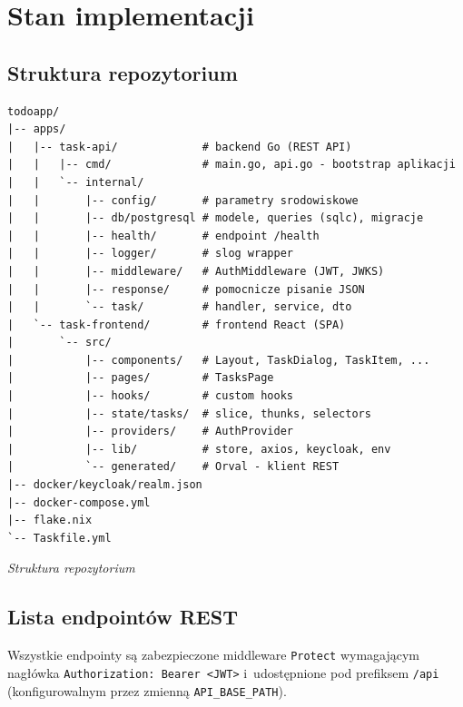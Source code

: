 \documentclass[12pt, a4paper, oneside]{article}
\newcommand{\codecaption}[1]{\par\vspace{-0.4em}\noindent\small\textit{#1}\par\vspace{0.3em}}
\begin{document}
\section{Stan implementacji}

\subsection{Struktura repozytorium}
\begin{verbatim}
todoapp/
|-- apps/
|   |-- task-api/             # backend Go (REST API)
|   |   |-- cmd/              # main.go, api.go - bootstrap aplikacji
|   |   `-- internal/
|   |       |-- config/       # parametry srodowiskowe
|   |       |-- db/postgresql # modele, queries (sqlc), migracje
|   |       |-- health/       # endpoint /health
|   |       |-- logger/       # slog wrapper
|   |       |-- middleware/   # AuthMiddleware (JWT, JWKS)
|   |       |-- response/     # pomocnicze pisanie JSON
|   |       `-- task/         # handler, service, dto
|   `-- task-frontend/        # frontend React (SPA)
|       `-- src/
|           |-- components/   # Layout, TaskDialog, TaskItem, ...
|           |-- pages/        # TasksPage
|           |-- hooks/        # custom hooks
|           |-- state/tasks/  # slice, thunks, selectors
|           |-- providers/    # AuthProvider
|           |-- lib/          # store, axios, keycloak, env
|           `-- generated/    # Orval - klient REST
|-- docker/keycloak/realm.json
|-- docker-compose.yml
|-- flake.nix
`-- Taskfile.yml
\end{verbatim}
\codecaption{Struktura repozytorium}

\subsection{Lista endpointów REST}
Wszystkie endpointy są zabezpieczone middleware \texttt{Protect}
wymagającym nagłówka \texttt{Authorization: Bearer <JWT>} i~udostępnione
pod prefiksem \texttt{/api} (konfigurowalnym przez zmienną
\texttt{API\_BASE\_PATH}).
\end{document}
